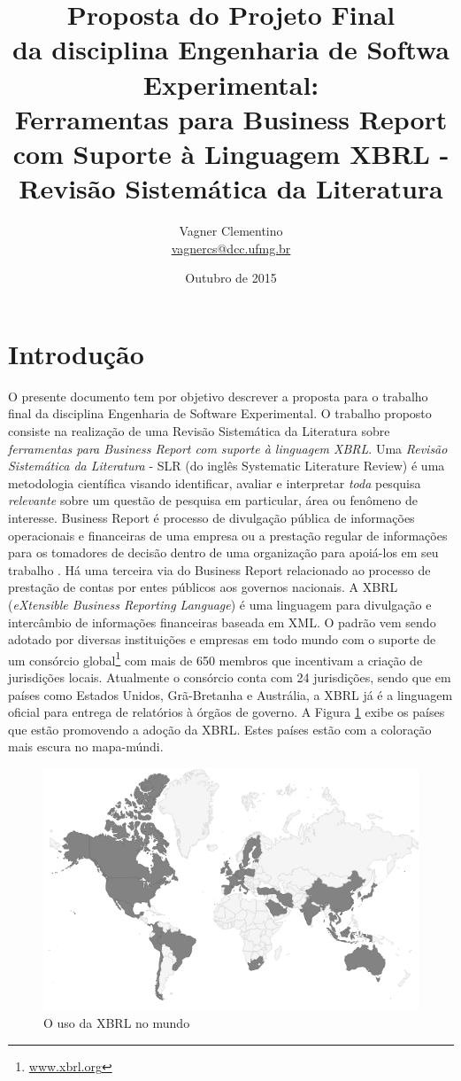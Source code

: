 \documentclass{article}
\title{Proposta do Projeto Final \\
       da disciplina Engenharia de Softwa Experimental: \\
Ferramentas para Business Report com Suporte à Linguagem XBRL - Revisão
Sistemática da Literatura
}
\author{Vagner Clementino \\ 
       \url{vagnercs@dcc.ufmg.br}}
\date{Outubro de  2015}
\begin{document}
\maketitle

\section{Introdução}
\label{sec:intro}

O presente documento tem por objetivo descrever a proposta para o
trabalho final da disciplina Engenharia de Software Experimental. O
trabalho proposto consiste na realização de uma Revisão Sistemática da
Literatura sobre \textit{ferramentas para Business Report com suporte à linguagem XBRL}. Uma \textit{Revisão Sistemática da Literatura} - SLR (do inglês Systematic Literature Review) é uma
metodologia científica visando identificar, avaliar e interpretar
\textit{toda} pesquisa \textit{relevante} sobre um questão de pesquisa
em particular, área ou fenômeno de interesse\cite{keele2007guidelines,wohlin2012experimentation}. Business Report é processo de  divulgação
pública de informações operacionais e financeiras de uma empresa  ou a
prestação regular de informações para os tomadores de decisão dentro
de uma organização para apoiá-los em seu trabalho
\cite{lymer1999business}. Há uma terceira via do Business Report
relacionado ao processo de prestação de contas por entes públicos aos
governos nacionais. A XBRL (\textit{eXtensible Business Reporting
  Language}) é uma linguagem para divulgação e intercâmbio de
informações financeiras baseada em
XML\cite{xbrl_conceitos_aplicacoes}. O padrão vem sendo adotado por
diversas instituições e empresas em todo mundo com o suporte de um
consórcio global\footnote{\url{www.xbrl.org}} com mais de 650 membros
que incentivam a criação de jurisdições locais. Atualmente o consórcio
conta com 24 jurisdições, sendo que em países como  Estados Unidos,
Grã-Bretanha e Austrália, a XBRL já é a linguagem oficial para entrega
de relatórios à órgãos de governo. A Figura \ref{fig:world_map} exibe
os países que estão promovendo a adoção da XBRL. Estes países estão
com a coloração mais escura no mapa-múndi.

\begin{figure}[hbtp]
\centering
\includegraphics[width=.75\textwidth]{../img/world-map.png}
\caption{O uso da XBRL no mundo}
\label{fig:world_map}
\end{figure}
\end{document}

